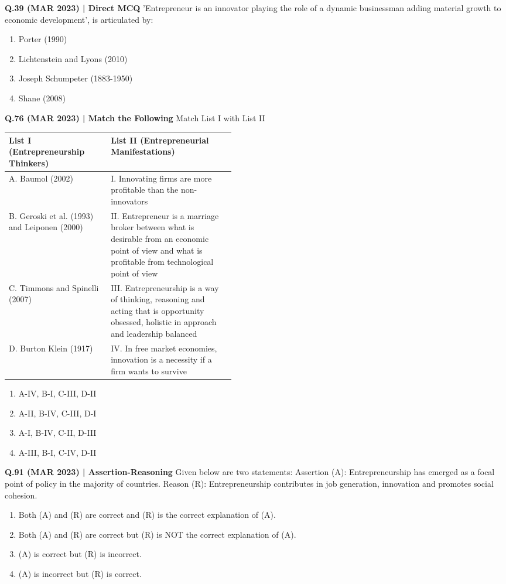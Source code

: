 \documentclass{article}
\begin{document}
\textbf{Q.39 (MAR 2023) | Direct MCQ}
'Entrepreneur is an innovator playing the role of a dynamic businessman adding material growth to economic development', is articulated by:
\begin{enumerate}[label=(\arabic*)]
    \item Porter (1990)
    \item Lichtenstein and Lyons (2010)
    \item Joseph Schumpeter (1883-1950)
    \item Shane (2008)
\end{enumerate}

\textbf{Q.76 (MAR 2023) | Match the Following}
Match List I with List II
\begin{tabularx}{\linewidth}{@{} p{0.45\linewidth} X @{}}
    \toprule
    \textbf{List I (Entrepreneurship Thinkers)} & \textbf{List II (Entrepreneurial Manifestations)} \\
    \midrule
    A. Baumol (2002) & I. Innovating firms are more profitable than the non-innovators \\
    B. Geroski et al. (1993) and Leiponen (2000) & II. Entrepreneur is a marriage broker between what is desirable from an economic point of view and what is profitable from technological point of view \\
    C. Timmons and Spinelli (2007) & III. Entrepreneurship is a way of thinking, reasoning and acting that is opportunity obsessed, holistic in approach and leadership balanced \\
    D. Burton Klein (1917) & IV. In free market economies, innovation is a necessity if a firm wants to survive \\
    \bottomrule
\end{tabularx}
\begin{enumerate}[label=(\arabic*)]
    \item A-IV, B-I, C-III, D-II
    \item A-II, B-IV, C-III, D-I
    \item A-I, B-IV, C-II, D-III
    \item A-III, B-I, C-IV, D-II
\end{enumerate}

\textbf{Q.91 (MAR 2023) | Assertion-Reasoning}
Given below are two statements:
Assertion (A): Entrepreneurship has emerged as a focal point of policy in the majority of countries.
Reason (R): Entrepreneurship contributes in job generation, innovation and promotes social cohesion.
\begin{enumerate}[label=(\arabic*)]
    \item Both (A) and (R) are correct and (R) is the correct explanation of (A).
    \item Both (A) and (R) are correct but (R) is NOT the correct explanation of (A).
    \item (A) is correct but (R) is incorrect.
    \item (A) is incorrect but (R) is correct.
\end{enumerate}
\end{document}
